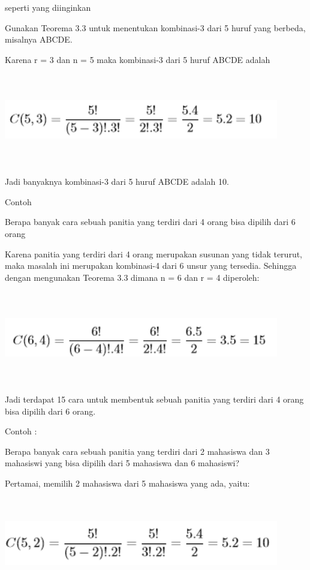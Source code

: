 \documentclass[11pt,fleqn]{book} %
\begin{document}
seperti yang diinginkan

Gunakan Teorema 3.3 untuk menentukan kombinasi-3 dari 5 huruf yang berbeda, misalnya ABCDE.


Karena r = 3 dan n = 5 maka kombinasi-3 dari 5 huruf ABCDE adalah

\includegraphics[width = 12cm, height= 4cm]{Pictures/herlin8.png}


Jadi banyaknya kombinasi-3 dari 5 huruf ABCDE adalah 10.


Contoh

Berapa banyak cara sebuah panitia yang terdiri dari 4 orang bisa dipilih dari 6 orang


Karena panitia yang terdiri dari 4 orang merupakan susunan yang tidak terurut, maka masalah ini merupakan kombinasi-4 dari 6 unsur yang tersedia. Sehingga dengan mengunakan Teorema 3.3 dimana n = 6 dan r = 4 diperoleh: 


\includegraphics[width = 12cm, height= 4cm]{Pictures/herlin9.png}

Jadi terdapat 15 cara untuk membentuk sebuah panitia yang terdiri dari 4 orang bisa dipilih dari 6 orang.

Contoh :

Berapa banyak cara sebuah panitia yang terdiri dari 2 mahasiswa dan 3 mahasiswi yang bisa dipilih dari 5 mahasiswa dan 6 mahasiswi?

Pertamai, memilih 2 mahasiswa dari 5 mahasiswa yang ada, yaitu:

\includegraphics[width = 12cm, height= 4cm]{Pictures/herlin10.png}
\end{document}
